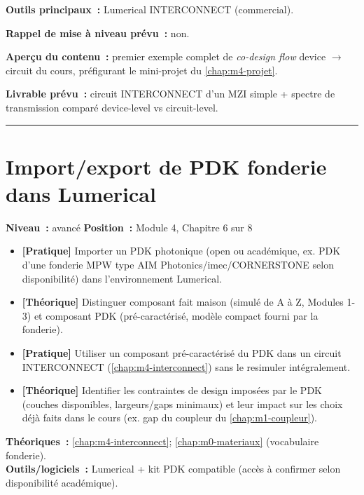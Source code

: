 \noindent\textbf{Outils principaux~:} Lumerical INTERCONNECT (commercial).

\noindent\textbf{Rappel de mise à niveau prévu~:} non.

\noindent\textbf{Aperçu du contenu~:} premier exemple complet de \emph{co-design flow} device $\to$ circuit du cours, préfigurant le mini-projet du \cref{chap:m4-projet}.

\noindent\textbf{Livrable prévu~:} circuit INTERCONNECT d'un MZI simple + spectre de transmission comparé device-level vs circuit-level.

\bigskip\hrule\bigskip

\chapter{Import/export de PDK fonderie dans Lumerical}
\label{chap:m4-pdk}

\noindent\textbf{Niveau~:} avancé \hfill \textbf{Position~:} Module 4, Chapitre 6 sur 8

\begin{objectifs}
\begin{itemize}[leftmargin=1.4em]
  \item \textbf{[Pratique]} Importer un PDK photonique (open ou académique, ex. PDK d'une fonderie MPW type AIM Photonics/imec/CORNERSTONE selon disponibilité) dans l'environnement Lumerical.
  \item \textbf{[Théorique]} Distinguer composant \og fait maison\fg{} (simulé de A à Z, Modules 1-3) et composant \og PDK\fg{} (pré-caractérisé, modèle compact fourni par la fonderie).
  \item \textbf{[Pratique]} Utiliser un composant pré-caractérisé du PDK dans un circuit INTERCONNECT (\cref{chap:m4-interconnect}) sans le resimuler intégralement.
  \item \textbf{[Théorique]} Identifier les contraintes de design imposées par le PDK (couches disponibles, largeurs/gaps minimaux) et leur impact sur les choix déjà faits dans le cours (ex. gap du coupleur du \cref{chap:m1-coupleur}).
\end{itemize}
\end{objectifs}

\begin{prerequis}
\textbf{Théoriques~:} \cref{chap:m4-interconnect}; \cref{chap:m0-materiaux} (vocabulaire fonderie).\\
\textbf{Outils/logiciels~:} Lumerical + kit PDK compatible (accès à confirmer selon disponibilité académique).
\end{prerequis}

